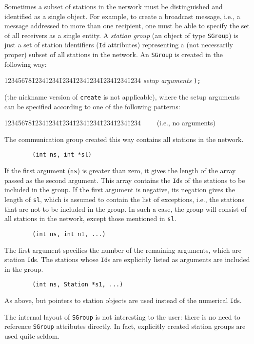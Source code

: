 Sometimes a subset of stations in the network must be distinguished and
identified as a single object.
For example, to create a broadcast message, i.e., a message addressed to
more than one recipient, one must be able to specify the set of all
receivers as a single entity.
A {\em station group\/} (an object of type {\tt SGroup}) is just a
set of station identifiers ({\tt Id} attributes) representing a
(not necessarily proper) subset of all stations in the network.
An {\tt SGroup} is created in the following way:
{\tt\begin{tabbing}
12345678\=1234\=1234\=1234\=1234\=1234\=1234\=1234\=1234\kill
{} {\em setup arguments} {\tt );}
\end{tabbing}}
\noindent
(the nickname version of {\tt create} is not applicable),
where the setup arguments can be specified according to one of the following
patterns:
\begin{tabbing}
12345678\=1234\=1234\=1234\=1234\=1234\=1234\=1234\=1234\kill
\>{\tt ()} \ \ \ \ (i.e., no arguments)
\end{tabbing}
The communication group created this way contains all stations in the network.
\begin{verbatim}
        (int ns, int *sl)
\end{verbatim}
If the first argument ({\tt ns})
is greater than zero, it gives the length of the
array passed as the second argument.
This array contains the {\tt Id}s of the stations to be included in the
group.
If the first argument is negative, its negation gives the length of {\tt sl},
which is assumed to contain the list of exceptions, i.e., the stations that
are not to be included in the group.
In such a case, the group will consist of
all stations in the network, except those mentioned in {\tt sl}.
\begin{verbatim}
        (int ns, int n1, ...)
\end{verbatim}
The first argument specifies the number of the remaining arguments, which are
station {\tt Id}s.
The stations whose {\tt Id}s are explicitly listed as arguments are included
in the group.
\begin{verbatim}
        (int ns, Station *s1, ...)
\end{verbatim}
As above, but pointers to station objects are used instead of the numerical
{\tt Id}s.

The internal layout of {\tt SGroup} is not interesting to the user: there
is no need to reference {\tt SGroup} attributes directly.
In fact, explicitly created station groups are used quite seldom.

